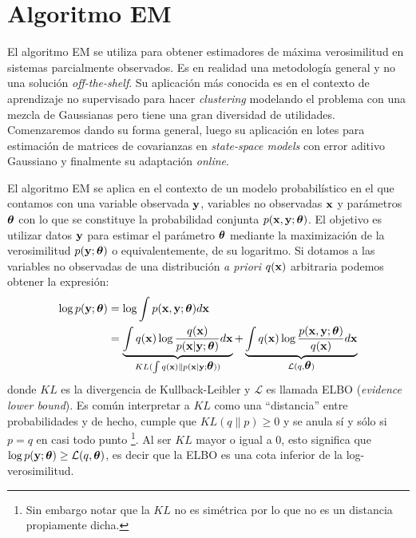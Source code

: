 \section{Algoritmo EM}

El algoritmo EM se utiliza para obtener estimadores de máxima verosimilitud en sistemas parcialmente observados. Es en realidad una metodología general y no una solución \textit{off-the-shelf}. Su aplicación más conocida es en el contexto de aprendizaje no supervisado para hacer \textit{clustering} modelando el problema con una mezcla de Gaussianas \citep{Bishop2006} pero tiene una gran diversidad de utilidades. Comenzaremos dando su forma general, luego su aplicación en lotes para estimación de matrices de covarianzas en \textit{state-space models} con error aditivo Gaussiano y finalmente su adaptación \textit{online}.

El algoritmo EM se aplica en el contexto de un modelo probabilístico en el que contamos con una variable observada $\mathbf{y}$, variables no observadas $\mathbf{x}$ y parámetros $\mbox{\boldmath$ \theta $}$ con lo que se constituye la probabilidad conjunta $p(\mathbf{x},  \mathbf{y}; \mbox{\boldmath$ \theta $})$. El objetivo es utilizar datos $\mathbf{y}$ para estimar el parámetro $\mbox{\boldmath$ \theta $}$ mediante la maximización de la verosimilitud $p(\mathbf{y}; \mbox{\boldmath$ \theta $})$ o equivalentemente, de su logaritmo. Si dotamos a las variables no observadas de una distribución \textit{a priori} $q(\mathbf{x})$ arbitraria podemos obtener la expresión:
\begin{align}
    \log p(\mathbf{y}; \mbox{\boldmath$ \theta $}) &=  \log \int p(\mathbf{x}, \mathbf{y}; \mbox{\boldmath$ \theta $}) d\mathbf{x} \\
    &=  \underbrace{\int q(\mathbf{x}) \log \frac{q(\mathbf{x})}{p(\mathbf{x} | \mathbf{y}; \mbox{\boldmath$ \theta $})} d\mathbf{x}}_{KL(\int q(\mathbf{x}) \rVert p(\mathbf{x} | \mathbf{y}; \mbox{\boldmath$ \theta $}))} + \underbrace{\int q(\mathbf{x}) \log \frac{p(\mathbf{x}, \mathbf{y}; \mbox{\boldmath$ \theta $})}{q(\mathbf{x})} d\mathbf{x}}_{\mathcal{L}(q, \mbox{\boldmath$ \theta $})} \label{eq:elbo_KL}
\end{align}
donde $KL$ es la divergencia de Kullback-Leibler y $\mathcal{L}$ es llamada ELBO (\textit{evidence lower bound}). Es común interpretar a $KL$ como una ``distancia'' entre probabilidades y de hecho, cumple que $KL(q \rVert p) \geq 0$ y se anula sí y sólo si $p = q$ en casi todo punto \footnote{Sin embargo notar que la $KL$ no es simétrica por lo que no es un distancia propiamente dicha.}. Al ser $KL$ mayor o igual a 0, esto significa que $\log p(\mathbf{y}; \mbox{\boldmath$ \theta $}) \geq \mathcal{L}(q, \mbox{\boldmath$ \theta $})$, es decir que la ELBO es una cota inferior de la log-verosimilitud.  

